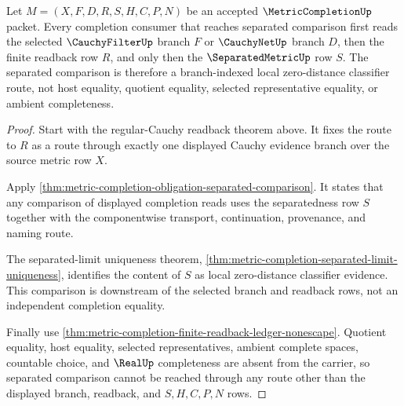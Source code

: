 \begin{theorem}
\label{thm:metric-completion-separated-branch-readback}
Let $M=(X,F,D,R,S,H,C,P,N)$ be an accepted $\MetricCompletionUp$ packet. Every completion consumer that reaches separated comparison first reads the selected $\CauchyFilterUp$ branch $F$ or $\CauchyNetUp$ branch $D$, then the finite readback row $R$, and only then the $\SeparatedMetricUp$ row $S$. The separated comparison is therefore a branch-indexed local zero-distance classifier route, not host equality, quotient equality, selected representative equality, or ambient completeness.
\end{theorem}
\begin{proof}
Start with the regular-Cauchy readback theorem above. It fixes the route to $R$ as a route through exactly one displayed Cauchy evidence branch over the source metric row $X$.

Apply \autoref{thm:metric-completion-obligation-separated-comparison}. It states that any comparison of displayed completion reads uses the separatedness row $S$ together with the componentwise transport, continuation, provenance, and naming route.

The separated-limit uniqueness theorem, \autoref{thm:metric-completion-separated-limit-uniqueness}, identifies the content of $S$ as local zero-distance classifier evidence. This comparison is downstream of the selected branch and readback rows, not an independent completion equality.

Finally use \autoref{thm:metric-completion-finite-readback-ledger-nonescape}. Quotient equality, host equality, selected representatives, ambient complete spaces, countable choice, and $\RealUp$ completeness are absent from the carrier, so separated comparison cannot be reached through any route other than the displayed branch, readback, and $S,H,C,P,N$ rows.
\end{proof}

